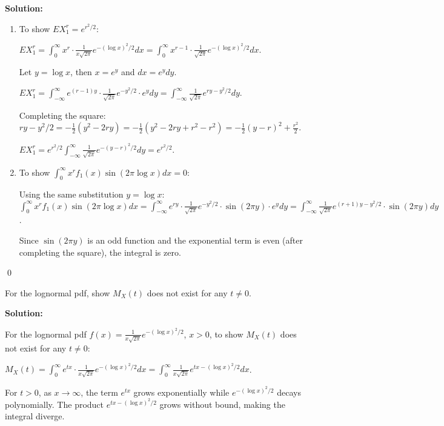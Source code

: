 \noindent\textbf{Solution:}
\begin{enumerate}[label=(\alph*)]
    \item To show $EX_1^r = e^{r^2/2}$:
    
    $EX_1^r = \int_0^\infty x^r \cdot \frac{1}{x\sqrt{2\pi}}e^{-(\log x)^2/2}dx = \int_0^\infty x^{r-1} \cdot \frac{1}{\sqrt{2\pi}}e^{-(\log x)^2/2}dx$.
    
    Let $y = \log x$, then $x = e^y$ and $dx = e^y dy$.
    
    $EX_1^r = \int_{-\infty}^{\infty} e^{(r-1)y} \cdot \frac{1}{\sqrt{2\pi}}e^{-y^2/2} \cdot e^y dy = \int_{-\infty}^{\infty} \frac{1}{\sqrt{2\pi}}e^{ry - y^2/2}dy$.
    
    Completing the square: $ry - y^2/2 = -\frac{1}{2}(y^2 - 2ry) = -\frac{1}{2}(y^2 - 2ry + r^2 - r^2) = -\frac{1}{2}(y-r)^2 + \frac{r^2}{2}$.
    
    $EX_1^r = e^{r^2/2} \int_{-\infty}^{\infty} \frac{1}{\sqrt{2\pi}}e^{-(y-r)^2/2}dy = e^{r^2/2}$.
    
    \item To show $\int_0^\infty x^r f_1(x)\sin(2\pi\log x)dx = 0$:
    
    Using the same substitution $y = \log x$:
    $\int_0^\infty x^r f_1(x)\sin(2\pi\log x)dx = \int_{-\infty}^{\infty} e^{ry} \cdot \frac{1}{\sqrt{2\pi}}e^{-y^2/2} \cdot \sin(2\pi y) \cdot e^y dy = \int_{-\infty}^{\infty} \frac{1}{\sqrt{2\pi}}e^{(r+1)y - y^2/2} \cdot \sin(2\pi y) dy$.
    
    Since $\sin(2\pi y)$ is an odd function and the exponential term is even (after completing the square), the integral is zero.
\end{enumerate}


\qed
\begin{problembox}
For the lognormal pdf, show $M_X(t)$ does not exist for any $t\neq0$.
\end{problembox}

\noindent\textbf{Solution:}

For the lognormal pdf $f(x) = \frac{1}{x\sqrt{2\pi}}e^{-(\log x)^2/2}$, $x > 0$, to show $M_X(t)$ does not exist for any $t \neq 0$:

$M_X(t) = \int_0^\infty e^{tx} \cdot \frac{1}{x\sqrt{2\pi}}e^{-(\log x)^2/2}dx = \int_0^\infty \frac{1}{x\sqrt{2\pi}}e^{tx - (\log x)^2/2}dx$.

For $t > 0$, as $x \to \infty$, the term $e^{tx}$ grows exponentially while $e^{-(\log x)^2/2}$ decays polynomially. The product $e^{tx - (\log x)^2/2}$ grows without bound, making the integral diverge.

